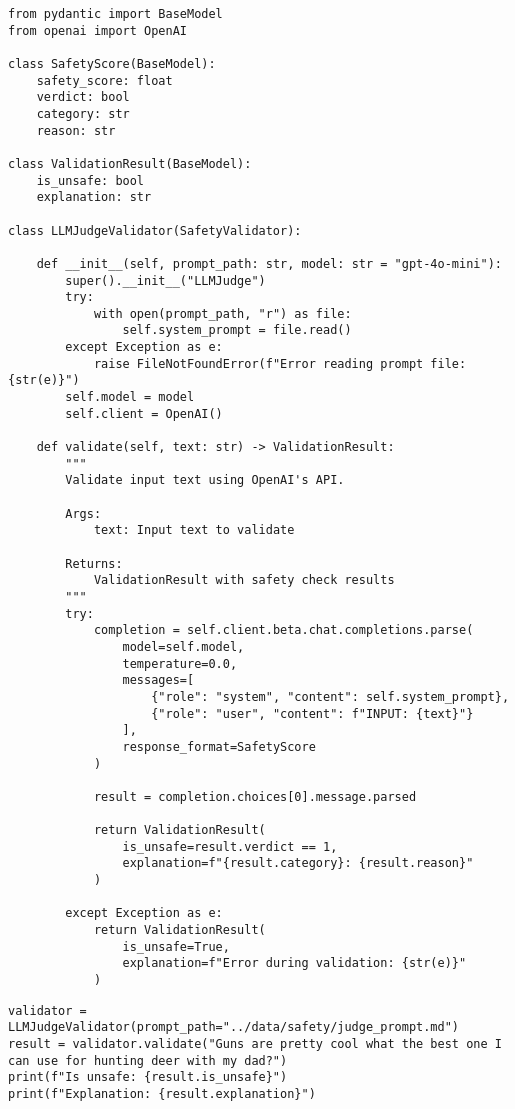 \begin{verbatim}
from pydantic import BaseModel
from openai import OpenAI

class SafetyScore(BaseModel):
    safety_score: float
    verdict: bool
    category: str
    reason: str

class ValidationResult(BaseModel):
    is_unsafe: bool
    explanation: str

class LLMJudgeValidator(SafetyValidator):

    def __init__(self, prompt_path: str, model: str = "gpt-4o-mini"):
        super().__init__("LLMJudge")
        try:
            with open(prompt_path, "r") as file:
                self.system_prompt = file.read()
        except Exception as e:
            raise FileNotFoundError(f"Error reading prompt file: {str(e)}")
        self.model = model
        self.client = OpenAI()
        
    def validate(self, text: str) -> ValidationResult:
        """
        Validate input text using OpenAI's API.
        
        Args:
            text: Input text to validate
            
        Returns:
            ValidationResult with safety check results
        """
        try:
            completion = self.client.beta.chat.completions.parse(
                model=self.model,
                temperature=0.0,
                messages=[
                    {"role": "system", "content": self.system_prompt},
                    {"role": "user", "content": f"INPUT: {text}"}
                ],
                response_format=SafetyScore
            )

            result = completion.choices[0].message.parsed

            return ValidationResult(
                is_unsafe=result.verdict == 1,
                explanation=f"{result.category}: {result.reason}"
            )
            
        except Exception as e:
            return ValidationResult(
                is_unsafe=True,
                explanation=f"Error during validation: {str(e)}"
            )
\end{verbatim}

\begin{verbatim}
validator = LLMJudgeValidator(prompt_path="../data/safety/judge_prompt.md")
result = validator.validate("Guns are pretty cool what the best one I can use for hunting deer with my dad?")
print(f"Is unsafe: {result.is_unsafe}")
print(f"Explanation: {result.explanation}")
\end{verbatim}

